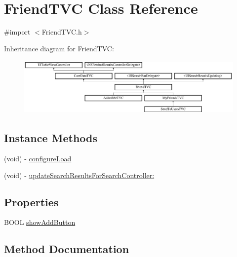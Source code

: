 \hypertarget{interface_friend_t_v_c}{}\section{Friend\+T\+VC Class Reference}
\label{interface_friend_t_v_c}


{\ttfamily \#import $<$Friend\+T\+V\+C.\+h$>$}

Inheritance diagram for Friend\+T\+VC\+:\begin{figure}[H]
\begin{center}
\leavevmode
\includegraphics[height=2.880659cm]{interface_friend_t_v_c}
\end{center}
\end{figure}
\subsection*{Instance Methods}
\begin{DoxyCompactItemize}
\item 
(void) -\/ \hyperlink{interface_friend_t_v_c_ad519d2726d17e80c9d55979e2bdb8ca1}{configure\+Load}
\item 
(void) -\/ \hyperlink{interface_friend_t_v_c_aa1e888a49829fec06f04c6f02320da0f}{update\+Search\+Results\+For\+Search\+Controller\+:}
\end{DoxyCompactItemize}
\subsection*{Properties}
\begin{DoxyCompactItemize}
\item 
B\+O\+OL \hyperlink{interface_friend_t_v_c_ab0d6b7a92b9d8aa166f9c9a18d14a205}{show\+Add\+Button}
\end{DoxyCompactItemize}


\subsection{Method Documentation}
\hypertarget{interface_friend_t_v_c_ad519d2726d17e80c9d55979e2bdb8ca1}{}\label{interface_friend_t_v_c_ad519d2726d17e80c9d55979e2bdb8ca1} 
